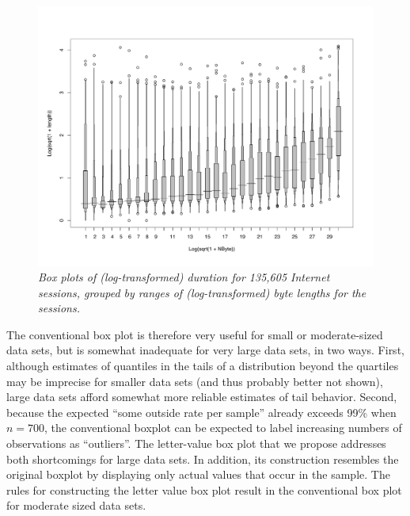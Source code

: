 \documentclass[11pt]{article}
\begin{document}
\begin{figure}[hbt]
\begin{center}
\includegraphics[scale=.5,angle=270]{lvbox2}
\caption{\it \label{kkewbox} Box plots of (log-transformed)
duration for 135,605 Internet sessions, grouped by
ranges of (log-transformed) byte lengths for the sessions.}
\end{center}
\end{figure}

The conventional box plot is therefore very useful for 
small or moderate-sized data sets, but is somewhat inadequate
for very large data sets, in two ways.  First, although
estimates of quantiles in the tails of a distribution 
beyond the quartiles may be imprecise for smaller data sets
(and thus probably better not shown), large data sets 
afford somewhat more reliable estimates of tail behavior.  
Second, because the expected ``some outside rate per sample''
already exceeds 99\% when $n = 700$,
the conventional boxplot can be expected to label
increasing numbers of observations as ``outliers''.
The letter-value box plot that we propose
addresses both shortcomings for large data sets.
In addition, its construction resembles the original 
boxplot by displaying only actual values that occur in 
the sample.  The rules for constructing the letter value
box plot result in the conventional box plot for moderate 
sized data sets.
\end{document}
